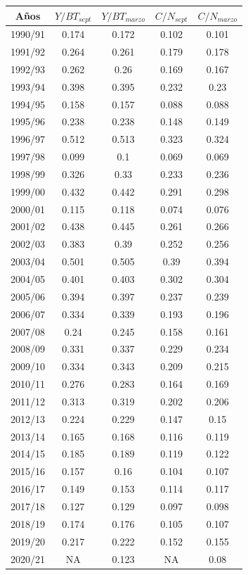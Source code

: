 \documentclass[
  spanish,
]{article}
\begin{document}
\begin{longtable}[]{@{}ccccc@{}}
\toprule
Años & \(Y/BT_{sept}\) & \(Y/BT_{marzo}\) & \(C/N_{sept}\) &
\(C/N_{marzo}\)\tabularnewline
\midrule
\endhead
1990/91 & 0.174 & 0.172 & 0.102 & 0.101\tabularnewline
1991/92 & 0.264 & 0.261 & 0.179 & 0.178\tabularnewline
1992/93 & 0.262 & 0.26 & 0.169 & 0.167\tabularnewline
1993/94 & 0.398 & 0.395 & 0.232 & 0.23\tabularnewline
1994/95 & 0.158 & 0.157 & 0.088 & 0.088\tabularnewline
1995/96 & 0.238 & 0.238 & 0.148 & 0.149\tabularnewline
1996/97 & 0.512 & 0.513 & 0.323 & 0.324\tabularnewline
1997/98 & 0.099 & 0.1 & 0.069 & 0.069\tabularnewline
1998/99 & 0.326 & 0.33 & 0.233 & 0.236\tabularnewline
1999/00 & 0.432 & 0.442 & 0.291 & 0.298\tabularnewline
2000/01 & 0.115 & 0.118 & 0.074 & 0.076\tabularnewline
2001/02 & 0.438 & 0.445 & 0.261 & 0.266\tabularnewline
2002/03 & 0.383 & 0.39 & 0.252 & 0.256\tabularnewline
2003/04 & 0.501 & 0.505 & 0.39 & 0.394\tabularnewline
2004/05 & 0.401 & 0.403 & 0.302 & 0.304\tabularnewline
2005/06 & 0.394 & 0.397 & 0.237 & 0.239\tabularnewline
2006/07 & 0.334 & 0.339 & 0.193 & 0.196\tabularnewline
2007/08 & 0.24 & 0.245 & 0.158 & 0.161\tabularnewline
2008/09 & 0.331 & 0.337 & 0.229 & 0.234\tabularnewline
2009/10 & 0.334 & 0.343 & 0.209 & 0.215\tabularnewline
2010/11 & 0.276 & 0.283 & 0.164 & 0.169\tabularnewline
2011/12 & 0.313 & 0.319 & 0.202 & 0.206\tabularnewline
2012/13 & 0.224 & 0.229 & 0.147 & 0.15\tabularnewline
2013/14 & 0.165 & 0.168 & 0.116 & 0.119\tabularnewline
2014/15 & 0.185 & 0.189 & 0.119 & 0.122\tabularnewline
2015/16 & 0.157 & 0.16 & 0.104 & 0.107\tabularnewline
2016/17 & 0.149 & 0.153 & 0.114 & 0.117\tabularnewline
2017/18 & 0.127 & 0.129 & 0.097 & 0.098\tabularnewline
2018/19 & 0.174 & 0.176 & 0.105 & 0.107\tabularnewline
2019/20 & 0.217 & 0.222 & 0.152 & 0.155\tabularnewline
2020/21 & NA & 0.123 & NA & 0.08\tabularnewline
\bottomrule
\end{longtable}

\normalsize

\pagebreak
\end{document}
